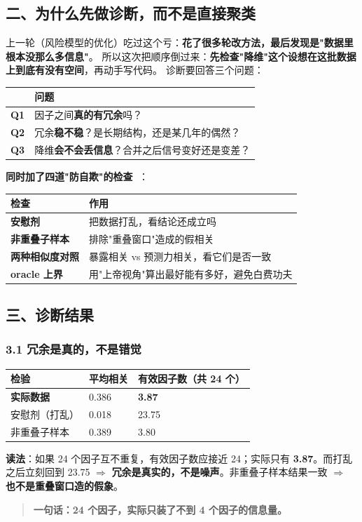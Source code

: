 \documentclass[11pt]{article}
\begin{document}
\subsection{\texorpdfstring{二、为什么先做诊断，而不是直接聚类}{二、为什么先做诊断，而不是直接聚类}}
上一轮（风险模型的优化）吃过这个亏：\textbf{花了很多轮改方法，最后发现是"数据里根本没那么多信息"}。
所以这次把顺序倒过来：\textbf{先检查"降维"这个设想在这批数据上到底有没有空间}，再动手写代码。
诊断要回答三个问题：
{\small
\begin{longtable}{p{1.80cm}p{14.40cm}}
\toprule
 & 问题 \\
\midrule
\textbf{Q1} & 因子之间\textbf{真的有冗余}吗？ \\
\textbf{Q2} & 冗余\textbf{稳不稳}？是长期结构，还是某几年的偶然？ \\
\textbf{Q3} & 降维\textbf{会不会丢信息}？合并之后信号变好还是变差？ \\
\bottomrule
\end{longtable}
}
\textbf{同时加了四道"防自欺"的检查} 🔴：
{\small
\begin{longtable}{p{4.86cm}p{11.34cm}}
\toprule
检查 & 作用 \\
\midrule
\textbf{安慰剂} & 把数据打乱，看结论还成立吗 \\
\textbf{非重叠子样本} & 排除"重叠窗口"造成的假相关 \\
\textbf{两种相似度对照} & 暴露相关 vs 预测力相关，看它们是否一致 \\
\textbf{oracle 上界} & 用"上帝视角"算出最好能有多好，避免白费功夫 \\
\bottomrule
\end{longtable}
}
\subsection{\texorpdfstring{三、诊断结果}{三、诊断结果}}
\subsubsection{\texorpdfstring{3.1 冗余是真的，不是错觉}{3.1 冗余是真的，不是错觉}}
{\small
\begin{longtable}{p{5.15cm}p{2.95cm}p{8.10cm}}
\toprule
检验 & 平均相关 & 有效因子数（共 24 个） \\
\midrule
\textbf{实际数据} & 0.386 & \textbf{3.87} \\
安慰剂（打乱） & 0.018 & 23.75 \\
非重叠子样本 & 0.389 & 3.80 \\
\bottomrule
\end{longtable}
}
\textbf{读法}：如果 24 个因子互不重复，有效因子数应接近 24；实际只有 \textbf{3.87}。而打乱之后立刻回到 23.75 \ensuremath{\Longrightarrow} \textbf{冗余是真实的，不是噪声}。非重叠子样本结果一致 \ensuremath{\Longrightarrow} \textbf{也不是重叠窗口造的假象}。
\begin{quote}
\textbf{一句话：24 个因子，实际只装了不到 4 个因子的信息量。}
\end{quote}
\end{document}
